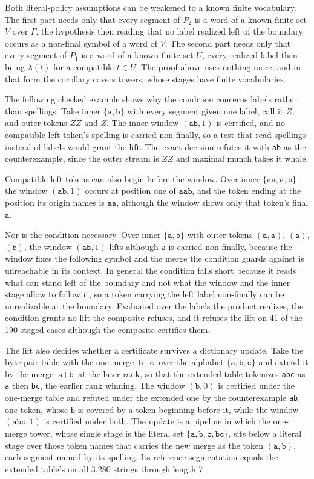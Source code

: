 \documentclass[11pt,a4paper]{article}
\theoremstyle{definition}
\theoremstyle{plain}
\newcommand{\code}[1]{\texttt{#1}}
\begin{document}
Both literal-policy assumptions can be weakened to a known finite vocabulary. The first part needs only that every
segment of $P_2$ is a word of a known finite set $V$ over $\Gamma$, the hypothesis then reading that no label realized
left of the boundary occurs as a non-final symbol of a word of $V$. The second part needs only that every segment of
$P_1$ is a word of a known finite set $U$, every realized label then being $\lambda(t)$ for a compatible $t \in U$. The
proof above uses nothing more, and in that form the corollary covers towers, whose stages have finite vocabularies.

The following checked example shows why the condition concerns labels rather than spellings. Take inner
$\{\code{a}, \code{b}\}$ with every segment given one label, call it $Z$, and outer tokens $ZZ$ and $Z$. The inner
window $(\code{ab}, 1)$ is certified, and no compatible left token's spelling is carried non-finally, so a test that
read spellings instead of labels would grant the lift. The exact decision refutes it with \code{ab} as the
counterexample, since the outer stream is $ZZ$ and maximal munch takes it whole.

Compatible left tokens can also begin before the window. Over inner $\{\code{aa}, \code{a}, \code{b}\}$ the window
$(\code{ab}, 1)$ occurs at position one of $\code{aab}$, and the token ending at the position its origin names is
$\code{aa}$, although the window shows only that token's final $\code{a}$.

Nor is the condition necessary. Over inner $\{\code{a}, \code{b}\}$ with outer tokens $(\code{a},\code{a})$,
$(\code{a})$, $(\code{b})$, the window $(\code{ab}, 1)$ lifts although \code{a} is carried non-finally, because the
window fixes the following symbol and the merge the condition guards against is unreachable in its context. In general
the condition falls short because it reads what can stand left of the boundary and not what the window and the inner
stage allow to follow it, so a token carrying the left label non-finally can be unrealizable at the boundary. Evaluated
over the labels the product realizes, the condition grants no lift the composite refuses, and it refuses the lift on 41
of the 190 staged cases although the composite certifies them.

The lift also decides whether a certificate survives a dictionary update. Take the byte-pair table with the one merge
$\code{b}+\code{c}$ over the alphabet $\{\code{a}, \code{b}, \code{c}\}$ and extend it by the merge $\code{a}+\code{b}$
at the later rank, so that the extended table tokenizes \code{abc} as \code{a} then \code{bc}, the earlier rank winning.
The window $(\code{b}, 0)$ is certified under the one-merge table and refuted under the extended one by the
counterexample \code{ab}, one token, whose \code{b} is covered by a token beginning before it, while the window
$(\code{abc}, 1)$ is certified under both. The update is a pipeline in which the one-merge tower, whose single stage is
the literal set $\{\code{a}, \code{b}, \code{c}, \code{bc}\}$, sits below a literal stage over those token names that
carries the new merge as the token $(\code{a}, \code{b})$, each segment named by its spelling. Its reference
segmentation equals the extended table's on all 3{,}280 strings through length 7.
\end{document}
